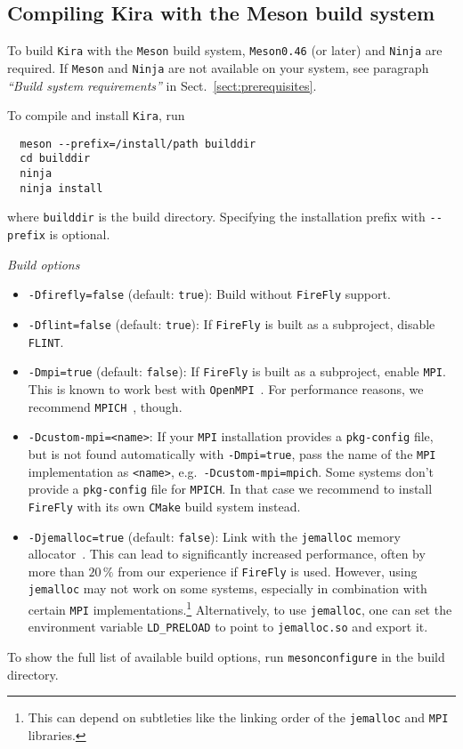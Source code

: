\documentclass[11pt,a4paper,DIV=11,numbers=noenddot,parskip=half]{scrartcl}
\newcommand{\code}[1]{\texttt{#1}}
\newcommand*{\kira}{\code{Kira}}
\newcommand*{\firefly}{\code{FireFly}}
\newcommand*{\flint}{\code{FLINT}}
\begin{document}
\subsection{Compiling Kira with the Meson build system}

To build \kira{} with the \code{Meson} build system, \code{Meson}\;\code{0.46}
(or later) and \code{Ninja} are required.
If \code{Meson} and \code{Ninja} are not available on your system, see
paragraph \textit{``Build system requirements''} in
Sect.~\ref{sect:prerequisites}.

To compile and install \kira{}, run
%
\begin{verbatim}
  meson --prefix=/install/path builddir
  cd builddir
  ninja
  ninja install
\end{verbatim}
%
where \code{builddir} is the build directory.
Specifying the installation prefix with \code{-{}-prefix} is optional.

\medskip\pagebreak[2]
\noindent
\textit{Build options}
%
\begin{itemize}
  \item \code{-Dfirefly=false} (default: \code{true}):
    Build without \code{FireFly} support.
  \item \code{-Dflint=false} (default: \code{true}):
    If \code{FireFly} is built as a subproject, disable \flint{}.
  \item \code{-Dmpi=true} (default: \code{false}):
    If \code{FireFly} is built as a subproject, enable \code{MPI}.
    This is known to work best with \code{OpenMPI}~\cite{openmpi,Gabriel:2004}.
    For performance reasons, we recommend \code{MPICH}~\cite{mpich}, though.
  \item \code{-Dcustom-mpi=<name>}: If your \code{MPI} installation provides
    a \code{pkg-config} file, but is not found automatically with
    \code{-Dmpi=true}, pass the name of the \code{MPI} implementation
    as \code{<name>}, e.g.\ \code{-Dcustom-mpi=mpich}.
    Some systems don't provide a \code{pkg-config} file for \code{MPICH}.
    In that case we recommend to install \code{FireFly} with its own
    \code{CMake} build system instead.
  \item \code{-Djemalloc=true} (default: \code{false}):
    Link with the \code{jemalloc} memory allocator~\cite{jemalloc}.
    This can lead to significantly increased performance, often by more
    than $20\,\%$ from our experience if \firefly{} is used.
    However, using \code{jemalloc} may not work on some systems, especially in
    combination with certain \code{MPI} implementations.\footnote{
    This can depend on subtleties like the linking order of the \code{jemalloc}
    and \code{MPI} libraries.}
    Alternatively, to use \code{jemalloc}, one can set the
    environment variable \code{LD\_PRELOAD} to point to \code{jemalloc.so}
    and export it.
\end{itemize}
%
To show the full list of available build options, run
\code{meson}\;\code{configure} in the build directory.
\end{document}
